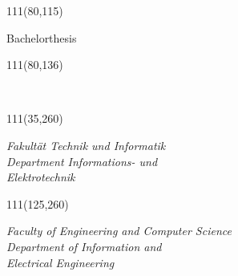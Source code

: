 


 


\thispagestyle{empty}
\begin{titlepage}
	\setlength{\TPHorizModule}{1mm}%
	\setlength{\TPVertModule}{1mm}%
	\textblockorigin{0mm}{0mm} %
	\begin{textblock}{111}(80,115)%
		\begin{minipage}[c][1.78cm][c]{10.65cm}%
  		\fontsize{22pt}{20pt}%
  		\selectfont%
  		\begin{center}%
  			Bachelorthesis%
  		\end{center}%
		\end{minipage}%
	\end{textblock}%
	\begin{textblock}{111}(80,136)%
		\begin{minipage}[c][4.81cm][t]{10.65cm}%
		\linespread{1.2}%
    		\fontsize{16pt}{14pt}%
    		\selectfont%
    		\begin{center}%
    			\theauthor \\\medskip\medskip\medskip%
    			\thetitle%
    		\end{center}%
    		\end{minipage}%
	\end{textblock}%
	\begin{textblock}{111}(35,260)%
		\begin{minipage}[c][1.5cm][t]{7.0cm}%
  		\fontsize{10pt}{10pt}%
  		\selectfont%
		\textit{%
  		Fakultät Technik und Informatik \\%
  		Department Informations- und \\%
		Elektrotechnik}%
		\end{minipage}%
	\end{textblock}%
\begin{textblock}{111}(125,260)%
		\begin{minipage}[c][1.5cm][t]{7.0cm}%
  		\fontsize{10pt}{10pt}%
  		\selectfont%
		\textit{%
  		Faculty of Engineering and Computer Science\\%
 		Department of Information and \\%
		Electrical Engineering}%
		\end{minipage}%
	\end{textblock}%
\end{titlepage}


